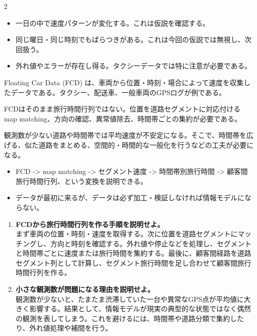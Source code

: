 \begin{multicols}{2}\footnotesize\raggedcolumns
{}
\begin{itemize}
\item 一日の中で速度パターンが変化する。これは仮説を確認する。
\item 同じ曜日・同じ時刻でもばらつきがある。これは今回の仮説では無視し、次回扱う。
\item 外れ値やエラーが存在し得る。タクシーデータでは特に注意が必要である。
\end{itemize}
Floating Car Data (FCD) は、車両から位置・時刻・場合によって速度を収集したデータである。タクシー、配送車、一般車両のGPSログが例である。\par

FCDはそのまま旅行時間行列ではない。位置を道路セグメントに対応付ける map matching、方向の確認、異常値除去、時間帯ごとの集約が必要である。\par

観測数が少ない道路や時間帯では平均速度が不安定になる。そこで、時間帯を広げる、似た道路をまとめる、空間的・時間的な一般化を行うなどの工夫が必要になる。\par
{}
\begin{itemize}
\item FCD -> map matching -> セグメント速度 -> 時間帯別旅行時間 -> 顧客間旅行時間行列、という変換を説明できる。
\item データが最初に来るが、データは必ず加工・検証しなければ情報モデルにならない。
\end{itemize}
\begin{enumerate}
\item \textbf{FCDから旅行時間行列を作る手順を説明せよ。}\\まず車両の位置・時刻・速度を取得する。次に位置を道路セグメントにマッチングし、方向と時刻を確認する。外れ値や停止などを処理し、セグメントと時間帯ごとに速度または旅行時間を集約する。最後に、顧客間経路を道路セグメント列として計算し、セグメント旅行時間を足し合わせて顧客間旅行時間行列を作る。
\item \textbf{小さな観測数が問題になる理由を説明せよ。}\\観測数が少ないと、たまたま渋滞していた一台や異常なGPS点が平均値に大きく影響する。結果として、情報モデルが現実の典型的な状態ではなく偶然の観測を表してしまう。これを避けるには、時間帯や道路分類で集約したり、外れ値処理や補間を行う。
\end{enumerate}
\end{multicols}

